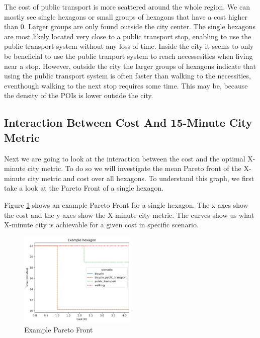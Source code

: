 The cost of public transport is more scattered around the whole region. We can mostly see single hexagons or small groups of hexagons that have a cost higher than 0.
Larger groups are only found outside the city center.
The single hexagons are most likely located very close to a public transport stop, enabling to use the public transport system without any loss of time.
Inside the city it seems to only be beneficial to use the public tranport system to reach necessesities when living near a stop.
However, outside the city the larger groups of hexagons indicate that using the public transport system is often faster than walking to the necessities, eventhough walking to the next stop requires some time.
This may be, because the density of the POIs is lower outside the city.


\subsection{Interaction Between Cost And 15-Minute City Metric}
\label{subsec:interaction_between_cost_and_15_minute_city_metric}

Next we are going to look at the interaction between the cost and the optimal X-minute city metric.
To do so we will investigate the mean Pareto front of the X-minute city metric and cost over all hexagons.
To understand this graph, we first take a look at the Pareto Front of a single hexagon.

Figure \ref{fig:example_pareto_front} shows an example Pareto Front for a single hexagon.
The x-axes show the cost and the y-axes show the X-minute city metric.
The curves show us what X-minute city is achievable for a given cost in specific scenario.

\begin{figure}
  \begin{center}
     \includegraphics[width=0.5\textwidth]{Figures/results/metric_cost/example_profile}
  \end{center}
  \caption{Example Pareto Front}
  \label{fig:example_pareto_front}
\end{figure}

